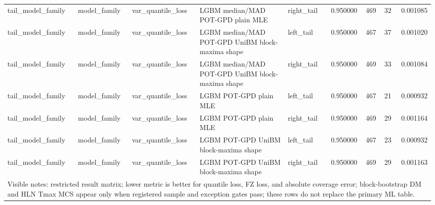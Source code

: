 \begin{tabular}{lllllrrrr}
tail\_model\_family & model\_family & var\_quantile\_loss & LGBM median/MAD POT-GPD plain MLE & right\_tail & 0.950000 & 469 & 32 & 0.001085 \\
tail\_model\_family & model\_family & var\_quantile\_loss & LGBM median/MAD POT-GPD UniBM block-maxima shape & left\_tail & 0.950000 & 467 & 37 & 0.001020 \\
tail\_model\_family & model\_family & var\_quantile\_loss & LGBM median/MAD POT-GPD UniBM block-maxima shape & right\_tail & 0.950000 & 469 & 33 & 0.001084 \\
tail\_model\_family & model\_family & var\_quantile\_loss & LGBM POT-GPD plain MLE & left\_tail & 0.950000 & 467 & 21 & 0.000932 \\
tail\_model\_family & model\_family & var\_quantile\_loss & LGBM POT-GPD plain MLE & right\_tail & 0.950000 & 469 & 29 & 0.001164 \\
tail\_model\_family & model\_family & var\_quantile\_loss & LGBM POT-GPD UniBM block-maxima shape & left\_tail & 0.950000 & 467 & 23 & 0.000932 \\
tail\_model\_family & model\_family & var\_quantile\_loss & LGBM POT-GPD UniBM block-maxima shape & right\_tail & 0.950000 & 469 & 29 & 0.001163 \\
\midrule
\multicolumn{9}{l}{\footnotesize Visible notes: restricted result matrix; lower metric is better for quantile loss, FZ loss, and absolute coverage error; block-bootstrap DM and HLN Tmax MCS appear only when registered sample and exception gates pass; these rows do not replace the primary ML table.} \\
\bottomrule
\end{tabular}
